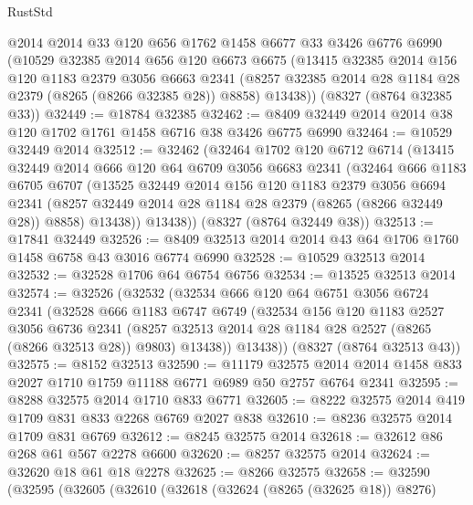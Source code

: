 \begin{lexlean}{RustStd}
\begin{coremodule}
    @2014
    @2014
    @33
    @120
    @656
    @1762
    @1458
    @6677
    @33
    @3426
    @6776
    @6990
    (@10529
      @32385
      @2014
      @656
      @120
      @6673
      @6675
      (@13415
        @32385
        @2014
        @156
        @120
        @1183
        @2379
        @3056
        @6663
        @2341
        (@8257 @32385 @2014 @28 @1184 @28 @2379 (@8265 (@8266 @32385 @28)) @8858)
        @13438))
    (@8327 (@8764 @32385 @33))
@32449 := @18784 @32385
@32462 := @8409 @32449 @2014 @2014 @38 @120 @1702 @1761 @1458 @6716 @38 @3426 @6775 @6990
@32464 := @10529 @32449 @2014
@32512 := @32462
    (@32464
      @1702
      @120
      @6712
      @6714
      (@13415
        @32449
        @2014
        @666
        @120
        @64
        @6709
        @3056
        @6683
        @2341
        (@32464
          @666
          @1183
          @6705
          @6707
          (@13525
            @32449
            @2014
            @156
            @120
            @1183
            @2379
            @3056
            @6694
            @2341
            (@8257 @32449 @2014 @28 @1184 @28 @2379 (@8265 (@8266 @32449 @28)) @8858)
            @13438))
        @13438))
    (@8327 (@8764 @32449 @38))
@32513 := @17841 @32449
@32526 := @8409 @32513 @2014 @2014 @43 @64 @1706 @1760 @1458 @6758 @43 @3016 @6774 @6990
@32528 := @10529 @32513 @2014
@32532 := @32528 @1706 @64 @6754 @6756
@32534 := @13525 @32513 @2014
@32574 := @32526
    (@32532
      (@32534
        @666
        @120
        @64
        @6751
        @3056
        @6724
        @2341
        (@32528
          @666
          @1183
          @6747
          @6749
          (@32534
            @156
            @120
            @1183
            @2527
            @3056
            @6736
            @2341
            (@8257 @32513 @2014 @28 @1184 @28 @2527 (@8265 (@8266 @32513 @28)) @9803)
            @13438))
        @13438))
    (@8327 (@8764 @32513 @43))
@32575 := @8152 @32513
@32590 := @11179
    @32575
    @2014
    @2014
    @1458
    @833
    @2027
    @1710
    @1759
    @11188
    @6771
    @6989
    @50
    @2757
    @6764
    @2341
@32595 := @8288 @32575 @2014 @1710 @833 @6771
@32605 := @8222 @32575 @2014 @419 @1709 @831 @833 @2268 @6769 @2027 @838
@32610 := @8236 @32575 @2014 @1709 @831 @6769
@32612 := @8245 @32575 @2014
@32618 := @32612 @86 @268 @61 @567 @2278 @6600
@32620 := @8257 @32575 @2014
@32624 := @32620 @18 @61 @18 @2278
@32625 := @8266 @32575
@32658 := @32590
    (@32595
      (@32605
        (@32610
          (@32618
            (@32624 (@8265 (@32625 @18)) @8276)

\end{coremodule}
\end{lexlean}
